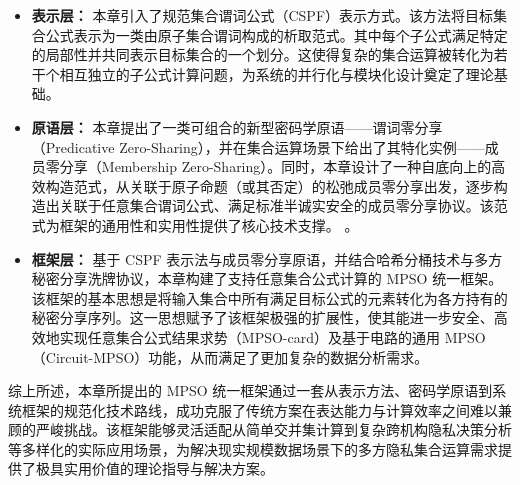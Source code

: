 \begin{itemize}
    \item \textbf{表示层：} 本章引入了规范集合谓词公式（CSPF）表示方式。该方法将目标集合公式表示为一类由原子集合谓词构成的析取范式。其中每个子公式满足特定的局部性并共同表示目标集合的一个划分。这使得复杂的集合运算被转化为若干个相互独立的子公式计算问题，为系统的并行化与模块化设计奠定了理论基础。
    \item \textbf{原语层：} 本章提出了一类可组合的新型密码学原语——谓词零分享（Predicative Zero-Sharing），并在集合运算场景下给出了其特化实例——成员零分享（Membership Zero-Sharing）。同时，本章设计了一种自底向上的高效构造范式，从关联于原子命题（或其否定）的松弛成员零分享出发，逐步构造出关联于任意集合谓词公式、满足标准半诚实安全的成员零分享协议。该范式为框架的通用性和实用性提供了核心技术支撑。
。
    \item \textbf{框架层：} 基于 CSPF 表示法与成员零分享原语，并结合哈希分桶技术与多方秘密分享洗牌协议，本章构建了支持任意集合公式计算的 MPSO 统一框架。该框架的基本思想是将输入集合中所有满足目标公式的元素转化为各方持有的秘密分享序列。这一思想赋予了该框架极强的扩展性，使其能进一步安全、高效地实现任意集合公式结果求势（MPSO-card）及基于电路的通用 MPSO（Circuit-MPSO）功能，从而满足了更加复杂的数据分析需求。
\end{itemize}

综上所述，本章所提出的 MPSO 统一框架通过一套从表示方法、密码学原语到系统框架的规范化技术路线，成功克服了传统方案在表达能力与计算效率之间难以兼顾的严峻挑战。该框架能够灵活适配从简单交并集计算到复杂跨机构隐私决策分析等多样化的实际应用场景，为解决现实规模数据场景下的多方隐私集合运算需求提供了极具实用价值的理论指导与解决方案。